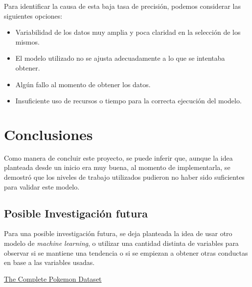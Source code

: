 \documentclass[]{elsarticle}
\begin{document}
Para identificar la causa de esta baja tasa de precisión, podemos considerar las siguientes opciones:

\begin{itemize}
    \item Variabilidad de los datos muy amplia y poca claridad en la selección de los mismos.
    \item El modelo utilizado no se ajusta adecuadamente a lo que se intentaba obtener.
    \item Algún fallo al momento de obtener los datos.
    \item Insuficiente uso de recursos o tiempo para la correcta ejecución del modelo.
\end{itemize}



\section{Conclusiones}
Como manera de concluir este proyecto, se puede inferir que, aunque la idea planteada desde un inicio era muy buena, al momento de implementarla, se demostró que los niveles de trabajo utilizados pudieron no haber sido suficientes para validar este modelo.

\subsection{Posible Investigación futura}

 Para una posible investigación futura, se deja planteada la idea de usar otro modelo de \textit{machine learning}, o utilizar una cantidad distinta de variables para observar si se mantiene una tendencia o si se empiezan a obtener otras conductas en base a las variables usadas.







\begin{thebibliography}{00}

\href{https://www.kaggle.com/datasets/rounakbanik/pokemon}{The Complete Pokemon Dataset
}

\end{thebibliography}
\end{document}
